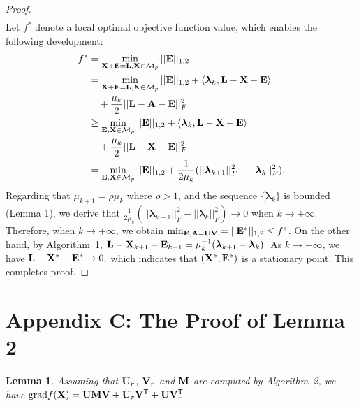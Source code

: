\documentclass[letterpaper]{article} %
\newtheorem{lemma}{Lemma}
\def\ranksym{p}
\def\symp{r}
\def\M{\mathcal{M}}
\def\U{{\bf U}}
\def\V{{\bf V}}
\def\trsp{{\sf T}}
\def\bA{{\bf A}}
\def\bM{{\bf M}}
\def\bE{{\bf E}}
\def\blambda{{\bm \lambda}}
\def\bL{{\bf L}}
\def\bU{{\bf U}}
\def\bV{{\bf V}}
\def\bX{{\bf X}}
\def\bA{{\bf A}}
\def\bX{{\bf X}}
\begin{document}
\begin{proof}
\begin{align}
    \end{align}
    \noindent
    Let $f^*$ denote a local optimal objective function value, which enables the following development:
    \begin{align}\label{eq:proof2}
      f^* & = \min_{\bX + \bE = \bL, \bX \in \M_{\ranksym}} || \bE ||_{1,2}   \nonumber  \\
          & = \min_{\bX + \bE = \bL, \bX \in \M_{\ranksym}} || \bE ||_{1,2} + \langle \blambda_k, \bL - \bX - \bE \rangle \nonumber \\
          & \quad + \frac{\mu_k}{2} || \bL - \bA - \bE ||_F^2   \nonumber \\
          & \geq \min_{\bE, \bX \in \M_{\ranksym}} || \bE ||_{1,2} + \langle \blambda_k, \bL - \bX - \bE \rangle \nonumber \\
          & \quad + \frac{\mu_k}{2} ||  \bL - \bX - \bE ||_F^2     \nonumber \\
          & = \min_{\bE, \bX \in \M_{\ranksym}} || \bE ||_{1,2} + \frac{1}{2\mu_k} (|| \blambda_{k+1} ||_F^2 - || \blambda_{k} ||_F^2)   .
    \end{align}
    \indent
    Regarding that $\mu_{k+1} = \rho \mu_{k}$ where $\rho > 1$, and the sequence $\{ \blambda_k \}$ is bounded (Lemma 1), we derive that
    $\frac{1}{2\mu_k} (|| \blambda_{k+1} ||_F^2 - || \blambda_{k} ||_F^2) \rightarrow 0$ when $k \rightarrow +\infty .$
    Therefore, when $k \rightarrow +\infty$, we obtain $\min_{\bE, \bA = \bU \bV} = || \bE^* ||_{1,2} \leq f^*$.
    On the other hand, by Algorithm~1, $\bL - \bX_{k+1} - \bE_{k+1} = \mu_k^{-1} (\blambda_{k+1} - \blambda_{k}) .$
    As $k \rightarrow +\infty$, we have $\bL - \bX^* - \bE^* \rightarrow 0  ,$
    which indicates that $(\bX^*, \bE^*)$ is a stationary point.
    This completes proof.
\end{proof}




\section{Appendix C: The Proof of Lemma 2}


\begin{lemma}
  Assuming that $\U_{\symp}$, $\V_{\symp}$ and $\bM$ are computed by Algorithm~2,
  we have {\small${\textnormal{grad}} f(\bX) = \U \bM \V + \U_{\symp} \V^{\trsp} + \U \V^{\trsp}_{\symp}$}.
\end{lemma}
\end{document}
